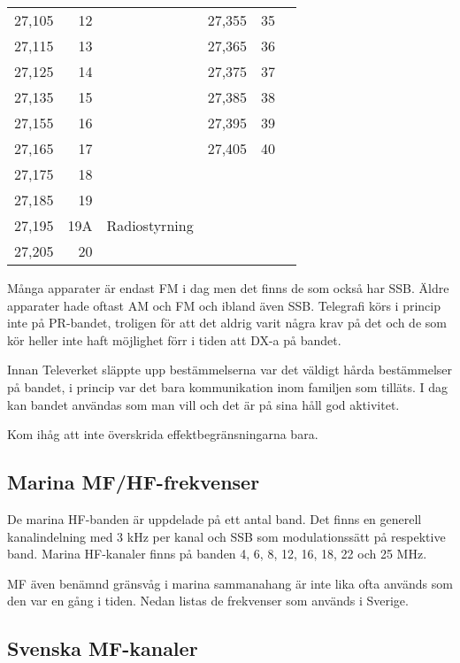 \begin{longtable}{rrl|rrl}
	  27,105 &      12 &                &   27,355 &      35 &           \\
	  27,115 &      13 &                &   27,365 &      36 &           \\
	  27,125 &      14 &                &   27,375 &      37 &           \\
	  27,135 &      15 &                &   27,385 &      38 &           \\
	  27,155 &      16 &                &   27,395 &      39 &           \\
	  27,165 &      17 &                &   27,405 &      40 &           \\
	  27,175 &      18 &                &          &         &           \\
	  27,185 &      19 &                &          &         &           \\
	  27,195 &     19A & Radiostyrning  &          &         &           \\
	  27,205 &      20 &                &          &         &
\end{longtable}

Många apparater är endast FM i dag men det finns de som också har SSB. Äldre
apparater hade oftast AM och FM och ibland även SSB. Telegrafi körs i princip
inte på PR-bandet, troligen för att det aldrig varit några krav på det och de
som kör heller inte haft möjlighet förr i tiden att DX-a på bandet.

Innan Televerket släppte upp bestämmelserna var det väldigt hårda bestämmelser
på bandet, i princip var det bara kommunikation inom familjen som tilläts. I dag
kan bandet användas som man vill och det är på sina håll god aktivitet.

Kom ihåg att inte överskrida effektbegränsningarna bara.

\subsection{Marina MF/HF-frekvenser}

De marina HF-banden är uppdelade på ett antal band. Det finns en
generell kanalindelning med 3 kHz per kanal och SSB som
modulationssätt på respektive band. Marina HF-kanaler finns på banden
4, 6, 8, 12, 16, 18, 22 och 25 MHz.

MF även benämnd gränsvåg i marina sammanahang är inte lika ofta
används som den var en gång i tiden. Nedan listas de frekvenser som
används i Sverige.

\subsection{Svenska MF-kanaler}

